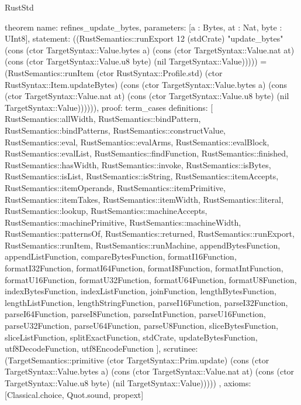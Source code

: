 \begin{lexlean}{RustStd}
\begin{semanticmodule}
theorem{
  name: refines_update_bytes,
  parameters: [a : Bytes, at : Nat, byte : UInt8],
  statement: ((RustSemantics::runExport 12 (stdCrate) "update_bytes" (cons (ctor TargetSyntax::Value.bytes a) (cons (ctor TargetSyntax::Value.nat at) (cons (ctor TargetSyntax::Value.u8 byte) (nil TargetSyntax::Value))))) = (RustSemantics::runItem (ctor RustSyntax::Profile.std) (ctor RustSyntax::Item.updateBytes) (cons (ctor TargetSyntax::Value.bytes a) (cons (ctor TargetSyntax::Value.nat at) (cons (ctor TargetSyntax::Value.u8 byte) (nil TargetSyntax::Value)))))),
  proof: term_cases{
    definitions: [
      RustSemantics::allWidth,
      RustSemantics::bindPattern,
      RustSemantics::bindPatterns,
      RustSemantics::constructValue,
      RustSemantics::eval,
      RustSemantics::evalArms,
      RustSemantics::evalBlock,
      RustSemantics::evalList,
      RustSemantics::findFunction,
      RustSemantics::finished,
      RustSemantics::hasWidth,
      RustSemantics::invoke,
      RustSemantics::isBytes,
      RustSemantics::isList,
      RustSemantics::isString,
      RustSemantics::itemAccepts,
      RustSemantics::itemOperands,
      RustSemantics::itemPrimitive,
      RustSemantics::itemTakes,
      RustSemantics::itemWidth,
      RustSemantics::literal,
      RustSemantics::lookup,
      RustSemantics::machineAccepts,
      RustSemantics::machinePrimitive,
      RustSemantics::machineWidth,
      RustSemantics::patternsOf,
      RustSemantics::returned,
      RustSemantics::runExport,
      RustSemantics::runItem,
      RustSemantics::runMachine,
      appendBytesFunction,
      appendListFunction,
      compareBytesFunction,
      formatI16Function,
      formatI32Function,
      formatI64Function,
      formatI8Function,
      formatIntFunction,
      formatU16Function,
      formatU32Function,
      formatU64Function,
      formatU8Function,
      indexBytesFunction,
      indexListFunction,
      joinFunction,
      lengthBytesFunction,
      lengthListFunction,
      lengthStringFunction,
      parseI16Function,
      parseI32Function,
      parseI64Function,
      parseI8Function,
      parseIntFunction,
      parseU16Function,
      parseU32Function,
      parseU64Function,
      parseU8Function,
      sliceBytesFunction,
      sliceListFunction,
      splitExactFunction,
      stdCrate,
      updateBytesFunction,
      utf8DecodeFunction,
      utf8EncodeFunction
    ],
    scrutinee: (TargetSemantics::primitive (ctor TargetSyntax::Prim.update) (cons (ctor TargetSyntax::Value.bytes a) (cons (ctor TargetSyntax::Value.nat at) (cons (ctor TargetSyntax::Value.u8 byte) (nil TargetSyntax::Value)))))
  },
  axioms: [Classical.choice, Quot.sound, propext]
}
\end{semanticmodule}
\end{lexlean}
